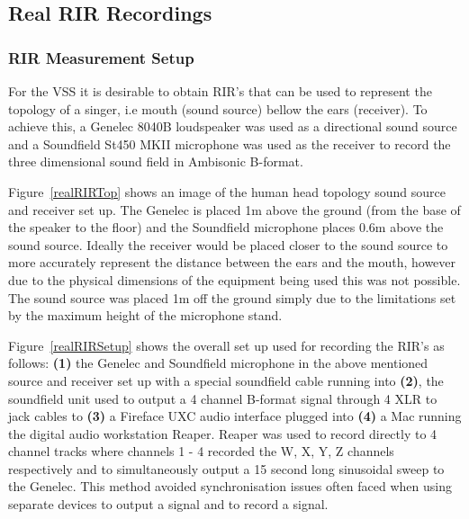 \documentclass[../../main.tex]{subfiles}
\begin{document}
\subsection{Real RIR Recordings}
\label{realRIRs}
	
	\subsubsection{RIR Measurement Setup}

		For the \ac{VSS} it is desirable to obtain \ac{RIR}'s that can be used to represent the topology of a singer, i.e mouth (sound source) bellow the ears (receiver). To achieve this, a Genelec 8040B \cite{genelec} loudspeaker was used as a directional sound source and a Soundfield St450 MKII microphone \cite{st450} was used as the receiver to record the three dimensional sound field in Ambisonic B-format. 

		Figure~\ref{realRIRTop} shows an image of the human head topology sound source and receiver set up. The Genelec is placed 1m above the ground (from the base of the speaker to the floor) and the Soundfield microphone places 0.6m above the sound source. Ideally the receiver would be placed closer to the sound source to more accurately represent the distance between the ears and the mouth, however due to the physical dimensions of the equipment being used this was not possible. The sound source was placed 1m off the ground simply due to the limitations set by the maximum height of the microphone stand.

		Figure~\ref{realRIRSetup} shows the overall set up used for recording the \ac{RIR}'s as follows: \textbf{(1)} the Genelec and Soundfield microphone in the above mentioned source and receiver set up with a special soundfield cable running into \textbf{(2)}, the soundfield unit used to output a 4 channel B-format signal through 4 XLR to jack cables to \textbf{(3)} a Fireface UXC audio interface plugged into \textbf{(4)} a Mac running the digital audio workstation Reaper. Reaper was used to record directly to 4 channel tracks where channels 1 - 4 recorded the W, X, Y, Z channels respectively and to simultaneously output a 15 second long sinusoidal sweep to the Genelec. This method avoided synchronisation issues often faced when using separate devices to output a signal and to record a signal.
\end{document}
